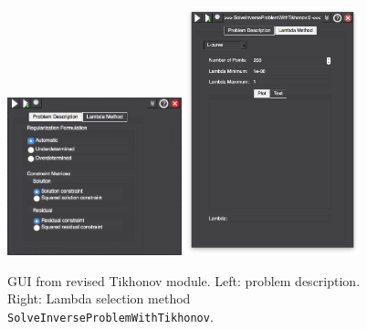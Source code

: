     \begin{figure}
    \begin{center}
    \includegraphics[width=0.45\textwidth]{ECGToolkitGuide_figures/tik2.png}
    \includegraphics[width=0.45\textwidth]{ECGToolkitGuide_figures/tik3.png}
    \caption{GUI from revised Tikhonov module. Left: problem description. Right: Lambda selection method {\tt SolveInverseProblemWithTikhonov}.}
    \label{fig:tik_module_gui}
    \end{center}
    \end{figure}


